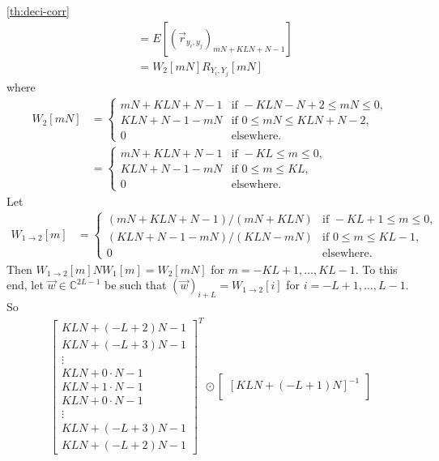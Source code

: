 \documentclass[a4paper, openany, oneside]{memoir}
\begin{document}
\begin{blockProofTheorem}{\ref{th:deci-corr}}
\begin{align*}
        &=E[(\vec{r}_{y_i,y_j})_{mN+KLN+N-1}] \\
        &= W_2[mN] R_{Y_i,Y_j}[mN]
    \end{align*}
    where
    \begin{align*}
        W_2[mN] &= \begin{cases}
            mN+KLN+N-1 & \text{if } -KLN-N+2 \le mN \le 0, \\
            KLN+N-1-mN& \text{if } 0 \le mN \le KLN+N-2, \\
            0 & \text{elsewhere.}
        \end{cases} \\
        &= \begin{cases}
            mN+KLN+N-1 & \text{if } -KL\le m \le 0, \\
            KLN+N-1-mN& \text{if } 0 \le m \le KL, \\
            0 & \text{elsewhere.}
        \end{cases}
    \end{align*}
    Let
    \begin{align*}
        W_{1 \to 2}[m] &= \begin{cases}
            (mN+KLN+N-1)/(mN+KLN) & \text{if } -KL+1 \le m \le 0, \\
            (KLN+N-1-mN)/(KLN-mN) & \text{if } 0 \le m \le KL-1, \\
            0 & \text{elsewhere.}
        \end{cases}
    \end{align*}
    Then $W_{1 \to 2}[m] N W_1[m] = W_2[mN]$ for $m = -KL+1,\ldots,KL-1$. To this end, let $\vec{w} \in \mathbb{C}^{2L-1}$ be such that $(\vec{w})_{i+L}=W_{1 \to 2}[i]$ for $i = -L+1,\ldots,L-1$. So
    \begin{align*}
        \begin{bmatrix}
            KLN+(-L+2)N-1 \\
            KLN+(-L+3)N-1 \\
            \vdots \\
            KLN+0\cdot N-1 \\
            KLN+1\cdot N-1 \\
            KLN+0\cdot N-1 \\
            \vdots \\
            KLN+(-L+3)N-1 \\
            KLN+(-L+2)N-1
         \end{bmatrix}^T \odot \begin{bmatrix}
            [KLN+(-L+1)N]^{-1} \\

\end{bmatrix}
\end{align*}
\end{blockProofTheorem}
\end{document}
